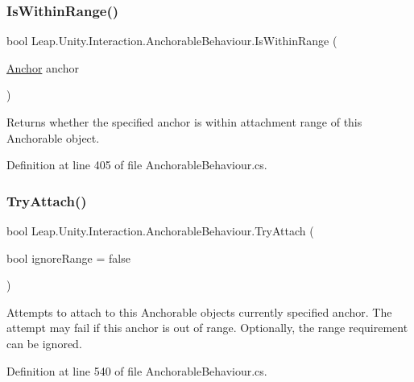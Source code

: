 \subsubsection{\texorpdfstring{IsWithinRange()}{IsWithinRange()}}
{\footnotesize\ttfamily bool Leap.\+Unity.\+Interaction.\+Anchorable\+Behaviour.\+Is\+Within\+Range (\begin{DoxyParamCaption}\item[{\mbox{\hyperlink{class_leap_1_1_unity_1_1_interaction_1_1_anchor}{Anchor}}}]{anchor }\end{DoxyParamCaption})}



Returns whether the specified anchor is within attachment range of this Anchorable object. 



Definition at line 405 of file Anchorable\+Behaviour.\+cs.

\mbox{\label{class_leap_1_1_unity_1_1_interaction_1_1_anchorable_behaviour_acf8928aca2c223daa30c8650564b9ab0}} 
\subsubsection{\texorpdfstring{TryAttach()}{TryAttach()}}
{\footnotesize\ttfamily bool Leap.\+Unity.\+Interaction.\+Anchorable\+Behaviour.\+Try\+Attach (\begin{DoxyParamCaption}\item[{bool}]{ignore\+Range = {\ttfamily false} }\end{DoxyParamCaption})}



Attempts to attach to this Anchorable object\textquotesingle{}s currently specified anchor. The attempt may fail if this anchor is out of range. Optionally, the range requirement can be ignored. 



Definition at line 540 of file Anchorable\+Behaviour.\+cs.

\mbox{\label{class_leap_1_1_unity_1_1_interaction_1_1_anchorable_behaviour_a526fd155d1bfdb640231bb0f5b26f159}} 
